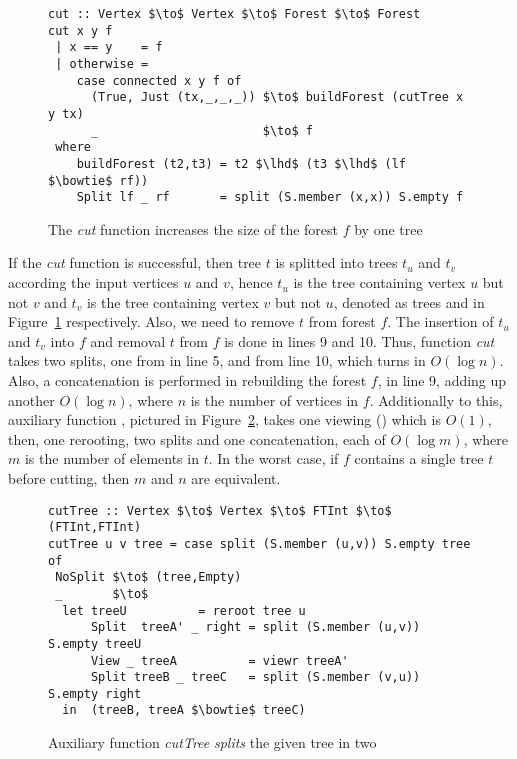 

\begin{figure}
\begin{lstlisting}[mathescape] 
cut :: Vertex $\to$ Vertex $\to$ Forest $\to$ Forest 
cut x y f  
 | x == y    = f  
 | otherwise = 
    case connected x y f of 
      (True, Just (tx,_,_,_)) $\to$ buildForest (cutTree x y tx) 
      _                       $\to$ f 
 where 
    buildForest (t2,t3) = t2 $\lhd$ (t3 $\lhd$ (lf $\bowtie$ rf)) 
    Split lf _ rf       = split (S.member (x,x)) S.empty f 
\end{lstlisting} 
\caption{The \textit{cut} function increases the size of the forest $f$ by one tree}
\label{fig:cut}
\end{figure}

If the \textit{cut} function is successful, then tree $t$ is splitted into trees $t_u$ and $t_v$ according the input vertices $u$ and $v$, hence $t_u$ is the tree containing vertex $u$ but not $v$ and $t_v$ is the tree containing vertex $v$ but not $u$, denoted as trees  and  in Figure~\ref{fig:cut} respectively. Also, we need to remove $t$ from forest $f$. The insertion of $t_u$ and $t_v$ into $f$ and removal $t$ from $f$ is done in lines 9 and 10. Thus, function \textit{cut} takes two splits, one from  in line 5, and from line 10, which turns in $O(\log n)$. Also, a concatenation is performed in rebuilding the forest $f$, in line 9, adding up another $O(\log n)$, where $n$ is the number of vertices in $f$. Additionally to this, auxiliary function , pictured in Figure~\ref{fig:cutTree}, takes one viewing () which is $O(1)$, then, one rerooting, two splits and one concatenation, each of $O(\log m)$, where $m$ is the number of elements in $t$. In the worst case, if $f$ contains a single tree $t$ before cutting, then $m$ and $n$ are equivalent.

\begin{figure}
\begin{lstlisting}[mathescape] 
cutTree :: Vertex $\to$ Vertex $\to$ FTInt $\to$ (FTInt,FTInt) 
cutTree u v tree = case split (S.member (u,v)) S.empty tree of
 NoSplit $\to$ (tree,Empty) 
 _       $\to$ 
  let treeU          = reroot tree u 
      Split  treeA' _ right = split (S.member (u,v)) S.empty treeU
      View _ treeA          = viewr treeA' 
      Split treeB _ treeC   = split (S.member (v,u)) S.empty right 
  in  (treeB, treeA $\bowtie$ treeC) 
\end{lstlisting} 
\caption{Auxiliary function \textit{cutTree} \textit{splits} the given tree in two}
\label{fig:cutTree}
\end{figure}



